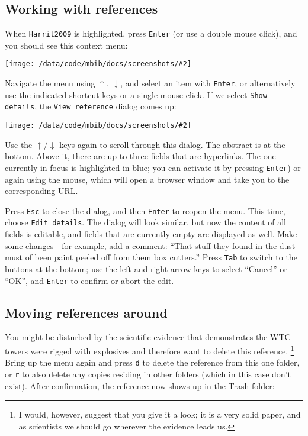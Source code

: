 \documentclass[10pt]{article}
\newcommand*{\key}[1]{\texttt{#1}\xspace}
\newcommand*{\arrowdown}{\key{$\downarrow$}}
\newcommand*{\arrowup}{\key{$\uparrow$}}
\newcommand{\screenshot}[2][]{%
\medskip\par
\begin{center}
\texttt{[image: /data/code/mbib/docs/screenshots/\#2]}
\end{center}}
\begin{document}
\subsection{Working with references}

When \texttt{Harrit2009} is highlighted, press \key{Enter} (or use a double mouse click), and you should see this context menu:

\screenshot{reference-menu}

\noindent Navigate the menu using \arrowup, \arrowdown, and select an item with \key{Enter}, or alternatively use the indicated shortcut keys or a single mouse click. If we select \texttt{Show details}, the \texttt{View reference} dialog comes up:

\screenshot{refview}

\noindent Use the \arrowup/\arrowdown keys again to scroll through this dialog.  The abstract is at the bottom. Above it, there are up to three fields that are hyperlinks. The one currently in focus is highlighted in blue; you can activate it by pressing \key{Enter}) or again using the mouse, which will open a browser window and take you to the corresponding URL. 

Press \texttt{Esc} to close the dialog, and then \key{Enter} to reopen the menu. This time, choose \texttt{Edit details}. The dialog will look similar, but now the content of all fields is editable, and fields that are currently empty are displayed as well. Make some changes---for example, add a comment: ``That stuff they found in the dust must of been paint peeled off from them box cutters.'' Press \texttt{Tab} to switch to the buttons at the bottom; use the left and right arrow keys to select ``Cancel'' or ``OK'', and \key{Enter} to confirm or abort the edit.  

\subsection{Moving references around}
\label{sec:moving}

You might be disturbed by the scientific evidence that demonstrates the WTC towers were rigged with explosives and therefore want to delete this reference.%
%
\footnote{I would, however, suggest that you give it a look; it is a very solid paper, and as scientists we should go wherever the evidence leads us.}
%
Bring up the menu again and press \texttt{d} to delete the reference from this one folder, or \texttt{r} to also delete any copies residing in other folders (which in this case don't exist). After confirmation, the reference now shows up in the Trash folder:
\end{document}

